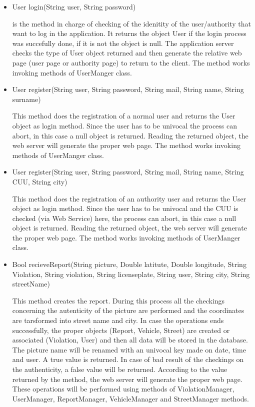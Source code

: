 \begin{itemize}
	\item 
	User login(String user, String password)
	
	is the method in charge of checking of the idenitity of the user/authority that want to log in the application. It returns the object User if the login process was succefully done, if it is not the object is null. The application server checks the type of User object returned and then generate the relative web page (user page or authority page) to return to the client.
	The method works invoking methods of UserManger class.
	
	\item 
	User register(String user, String password, String mail, String name, String surname)
	
	This method does the registration of a normal user and returns the User object as login method. Since the user has to be univocal the process can abort, in this case a null object is returned.
	Reading the returned object, the web server will generate the proper web page.
	The method works invoking methods of UserManger class.
	
	\item 
	User register(String user, String password, String mail, String name, String CUU, String city)
	
	This method does the registration of an authority user and returns the User object as login method. Since the user has to be univocal and the CUU is checked (via Web Service) here, the process can abort, in this case a null object is returned.
	Reading the returned object, the web server will generate the proper web page.
	The method works invoking methods of UserManger class.
	
	\item
	 Bool recieveReport(String picture, Double latitute, Double longitude, String Violation, String violation, String licenseplate, String user, String city, String streetName)
	 
	 This method creates the report. During this process all the checkings concerning the autenticity of the picture are performed and the coordinates are tarsformed into street name and city. In case the operations ends successfully, the proper objects (Report, Vehicle, Street) are created or associated (Violation, User) and then all data will be stored in the database. The picture name will be renamed with an univocal key made on date, time and user. A true value is returned.
	 In case of bad result of the checkings on the authenticity, a false value will be returned.
	 According to the value returned by the method, the web server will generate the proper web page.
	 These operations will be performed using methods of ViolationManager, UserManager, ReportManager, VehicleManager and  StreetManager methods.
	 

\end{itemize}
